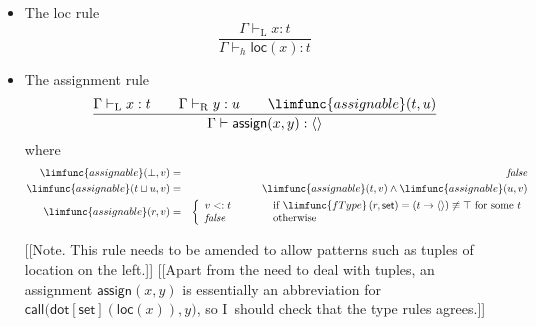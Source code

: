 \documentclass[12pt]{article}
\begin{document}
\begin{itemize}
\item The loc rule%
\begin{equation*}
\frac{\Gamma \vdash _{\mathrm{L}}x:t}{\Gamma \vdash _{h}\mathsf{loc}(x):t}
\end{equation*}

\item The assignment rule%
\begin{equation*}
\frac{\Gamma \vdash _{\mathrm{L}}x:t\qquad \Gamma \vdash _{\mathrm{R}%
}y:u\qquad \limfunc{assignable}(t,u)}{\Gamma \vdash \mathsf{assign}%
(x,y):\left\langle {}\right\rangle }
\end{equation*}%
where%
\begin{eqnarray*}
\limfunc{assignable}(\bot ,v) &=&\mathit{false} \\
\limfunc{assignable}(t\sqcup u,v) &=&\limfunc{assignable}(t,v)\wedge 
\limfunc{assignable}(u,v) \\
\limfunc{assignable}(r,v) &=&\left\{ 
\begin{array}{lll}
v<:t & \qquad  & \text{if }\limfunc{fType}\left( r,\mathsf{set}\right)
=\left( t\rightarrow \left\langle {}\right\rangle \right) \not\equiv \top 
\text{ for some }t \\ 
\mathit{false} &  & \text{otherwise}%
\end{array}%
\right. 
\end{eqnarray*}

[[Note. This rule needs to be amended to allow patterns such as tuples of
location on the left.]] [[Apart from the need to deal with tuples, an
assignment $\mathsf{assign}(x,y)$ is essentially an abbreviation for $%
\mathsf{call(dot}\left[ \mathsf{set}\right] (\mathsf{loc}(x)),y)$, so I\
should check that the type rules agrees.]]


\end{itemize}
\end{document}
